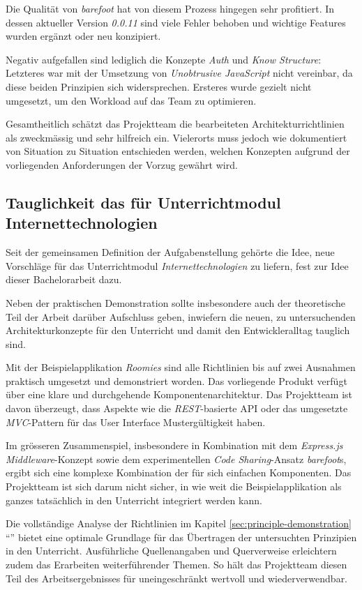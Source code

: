 Die Qualität von \emph{barefoot} hat von diesem Prozess hingegen sehr profitiert. In dessen aktueller Version \emph{0.0.11} sind viele Fehler behoben und wichtige Features wurden ergänzt oder neu konzipiert.

Negativ aufgefallen sind lediglich die Konzepte \emph{Auth} und \emph{Know Structure}: Letzteres war mit der Umsetzung von \emph{Unobtrusive JavaScript} nicht vereinbar, da diese beiden Prinzipien sich widersprechen. Ersteres wurde gezielt nicht umgesetzt, um den Workload auf das Team zu optimieren.

Gesamtheitlich schätzt das Projektteam die bearbeiteten Architekturrichtlinien als zweckmässig und sehr hilfreich ein. Vielerorts muss jedoch wie dokumentiert von Situation zu Situation entschieden werden, welchen Konzepten aufgrund der vorliegenden Anforderungen der Vorzug gewährt wird.


\subsection*{Tauglichkeit das für Unterrichtmodul Internettechnologien}

Seit der gemeinsamen Definition der Aufgabenstellung gehörte die Idee, neue Vorschläge für das Unterrichtmodul \emph{Internettechnologien} zu liefern, fest zur Idee dieser Bachelorarbeit dazu.

Neben der praktischen Demonstration sollte insbesondere auch der theoretische Teil der Arbeit darüber Aufschluss geben, inwiefern die neuen, zu untersuchenden Architekturkonzepte für den Unterricht und damit den Entwickleralltag tauglich sind.

Mit der Beispielapplikation \emph{Roomies} sind alle Richtlinien bis auf zwei Ausnahmen praktisch umgesetzt und demonstriert worden. Das vorliegende Produkt verfügt über eine klare und durchgehende Komponentenarchitektur. Das Projektteam ist davon überzeugt, dass Aspekte wie die \emph{REST}-basierte API oder das umgesetzte \emph{MVC}-Pattern für das User Interface Mustergültigkeit haben.

Im grösseren Zusammenspiel, insbesondere in Kombination mit dem \emph{Express.js Middleware}-Konzept sowie dem experimentellen \emph{Code Sharing}-Ansatz \emph{barefoot}s, ergibt sich eine komplexe Kombination der für sich einfachen Komponenten. Das Projektteam ist sich darum nicht sicher, in wie weit die Beispielapplikation als ganzes tatsächlich in den Unterricht integriert werden kann.

Die vollständige Analyse der Richtlinien im Kapitel \ref{sec:principle-demonstration} ``'' bietet eine optimale Grundlage für das Übertragen der untersuchten Prinzipien in den Unterricht. Ausführliche Quellenangaben und Querverweise erleichtern zudem das Erarbeiten weiterführender Themen. So hält das Projektteam diesen Teil des Arbeitsergebnisses für uneingeschränkt wertvoll und wiederverwendbar.



